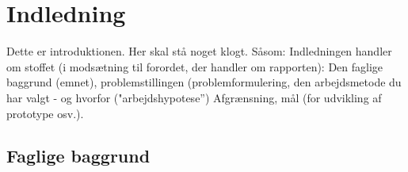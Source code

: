 
\chapter{Indledning}
Dette er introduktionen. Her skal stå noget klogt. Såsom: Indledningen handler om stoffet (i modsætning til forordet, der handler om rapporten): Den faglige baggrund (emnet), problemstillingen (problemformulering, den arbejdsmetode du har valgt - og hvorfor ("arbejdshypotese”) Afgrænsning, mål (for udvikling af prototype osv.).

\section{Faglige baggrund}
\lipsum[3]
